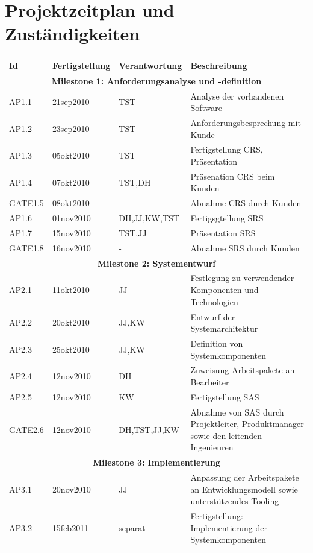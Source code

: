 
\chapter{Projektzeitplan und Zuständigkeiten}
\label{cha:proz}

\begin{longtable}[h]{| l | l | l | p{7.5cm} |}
\hline
\bf{Id} & \bf{Fertigstellung} & \bf{Verantwortung} & \bf{Beschreibung}\\
\hline\hline
\endfirsthead
\multicolumn{4}{|c|}{\bf{Milestone 1: Anforderungsanalyse und -definition}}\\
\hline
AP1.1 & 21sep2010 & TST & Analyse der vorhandenen Software\\
AP1.2 & 23sep2010 & TST & Anforderungsbesprechung mit Kunde\\
AP1.3 & 05okt2010 & TST & Fertigstellung CRS, Präsentation\\
AP1.4 & 07okt2010 & TST,DH & Präsenation CRS beim Kunden\\
GATE1.5 & 08okt2010 & - & Abnahme CRS durch Kunden\\
AP1.6 & 01nov2010 & DH,JJ,KW,TST & Fertigsgtellung SRS\\
AP1.7 & 15nov2010 & TST,JJ & Präsentation SRS\\
GATE1.8 & 16nov2010 & - & Abnahme SRS durch Kunden\\
\hline
\multicolumn{4}{|c|}{\bf{Milestone 2: Systementwurf}}\\
\hline
AP2.1 & 11okt2010 & JJ & Festlegung zu verwendender Komponenten und
Technologien\\
AP2.2 & 20okt2010 & JJ,KW & Entwurf der Systemarchitektur\\
AP2.3 & 25okt2010 & JJ,KW & Definition von Systemkomponenten\\
AP2.4 & 12nov2010 & DH & Zuweisung Arbeitspakete an Bearbeiter\\
AP2.5 & 12nov2010 & KW & Fertigstellung SAS\\
GATE2.6 & 12nov2010 & DH,TST,JJ,KW & Abnahme von SAS durch Projektleiter,
Produktmanager sowie den leitenden Ingenieuren\\
\hline
\multicolumn{4}{|c|}{\bf{Milestone 3: Implementierung}}\\
\hline
AP3.1 & 20nov2010 & JJ & Anpassung der Arbeitspakete an Entwicklungsmodell sowie
unterstützendes Tooling\\
AP3.2 & 15feb2011 & separat & Fertigstellung: Implementierung der
Systemkomponenten\\

\end{longtable}
